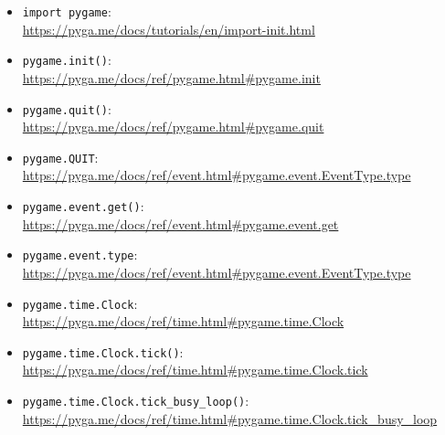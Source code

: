 \begin{itemize}
	\item \texttt{import pygame}:\\ \url{https://pyga.me/docs/tutorials/en/import-init.html}
	
	
	\item \texttt{pygame.init()}:
	\\
	\url{https://pyga.me/docs/ref/pygame.html#pygame.init}
	
	\item \texttt{pygame.quit()}:
	\\
	\url{https://pyga.me/docs/ref/pygame.html#pygame.quit}

	\item \texttt{pygame.QUIT}:
	\\
    \url{https://pyga.me/docs/ref/event.html#pygame.event.EventType.type}
	
	\item \texttt{pygame.event.get()}:
	\\
	\url{https://pyga.me/docs/ref/event.html#pygame.event.get}
	
	\item \texttt{pygame.event.type}:
	\\
	\url{https://pyga.me/docs/ref/event.html#pygame.event.EventType.type}
	
	\item \texttt{pygame.time.Clock}:
	\\
	\url{https://pyga.me/docs/ref/time.html#pygame.time.Clock}

	\item \texttt{pygame.time.Clock.tick()}:
	\\
	\url{https://pyga.me/docs/ref/time.html#pygame.time.Clock.tick}
	
	\item \texttt{pygame.time.Clock.tick\_busy\_loop()}:
	\\
	\url{https://pyga.me/docs/ref/time.html#pygame.time.Clock.tick_busy_loop}
	

\end{itemize}
